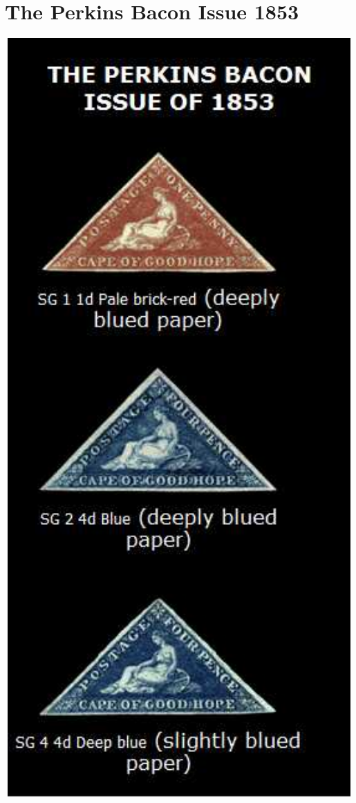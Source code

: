 \chapter{The Perkins Bacon Issue 1853
} 
\begin{marginfigure}
\includegraphics[width=1.0\textwidth]{../cape-of-good-hope/bacon.jpg}
\end{marginfigure}
  	 
